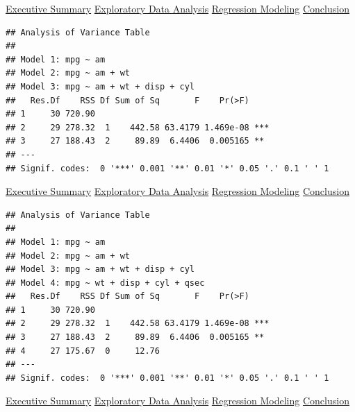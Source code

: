 \documentclass[10pt,]{article}
\begin{document}
\hyperref[eo]{Executive Summary} \textbar{} \hyperref[eda]{Exploratory
Data Analysis} \textbar{} \hyperref[rm]{Regression Modeling} \textbar{}
\hyperref[conclusion]{Conclusion}


\begin{verbatim}
## Analysis of Variance Table
## 
## Model 1: mpg ~ am
## Model 2: mpg ~ am + wt
## Model 3: mpg ~ am + wt + disp + cyl
##   Res.Df    RSS Df Sum of Sq       F    Pr(>F)    
## 1     30 720.90                                   
## 2     29 278.32  1    442.58 63.4179 1.469e-08 ***
## 3     27 188.43  2     89.89  6.4406  0.005165 ** 
## ---
## Signif. codes:  0 '***' 0.001 '**' 0.01 '*' 0.05 '.' 0.1 ' ' 1
\end{verbatim}

\hyperref[eo]{Executive Summary} \textbar{} \hyperref[eda]{Exploratory
Data Analysis} \textbar{} \hyperref[rm]{Regression Modeling} \textbar{}
\hyperref[conclusion]{Conclusion}


\begin{verbatim}
## Analysis of Variance Table
## 
## Model 1: mpg ~ am
## Model 2: mpg ~ am + wt
## Model 3: mpg ~ am + wt + disp + cyl
## Model 4: mpg ~ wt + disp + cyl + qsec
##   Res.Df    RSS Df Sum of Sq       F    Pr(>F)    
## 1     30 720.90                                   
## 2     29 278.32  1    442.58 63.4179 1.469e-08 ***
## 3     27 188.43  2     89.89  6.4406  0.005165 ** 
## 4     27 175.67  0     12.76                      
## ---
## Signif. codes:  0 '***' 0.001 '**' 0.01 '*' 0.05 '.' 0.1 ' ' 1
\end{verbatim}

\hyperref[eo]{Executive Summary} \textbar{} \hyperref[eda]{Exploratory
Data Analysis} \textbar{} \hyperref[rm]{Regression Modeling} \textbar{}
\hyperref[conclusion]{Conclusion}

\end{document}
